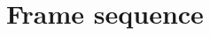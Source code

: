 \documentclass[a4paper, 10pt, oneside]{book}
\begin{document}
\setcounter{chapter}{0}

\tableofcontents \newpage
\chapter{Frame sequence} \newpage

\end{document}
